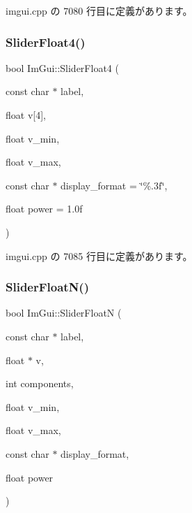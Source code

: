  imgui.\+cpp の 7080 行目に定義があります。

\mbox{\label{namespace_im_gui_aab6b7e99cab3975fece12fb1cd56e281}} 
\subsubsection{\texorpdfstring{Slider\+Float4()}{SliderFloat4()}}
{\footnotesize\ttfamily bool Im\+Gui\+::\+Slider\+Float4 (\begin{DoxyParamCaption}\item[{const char $\ast$}]{label,  }\item[{float}]{v\mbox{[}4\mbox{]},  }\item[{float}]{v\+\_\+min,  }\item[{float}]{v\+\_\+max,  }\item[{const char $\ast$}]{display\+\_\+format = {\ttfamily \char`\"{}\%.3f\char`\"{}},  }\item[{float}]{power = {\ttfamily 1.0f} }\end{DoxyParamCaption})}



 imgui.\+cpp の 7085 行目に定義があります。

\mbox{\label{namespace_im_gui_a3ffffbdfe59f18a2321dd1cb39dfb6e1}} 
\subsubsection{\texorpdfstring{Slider\+Float\+N()}{SliderFloatN()}}
{\footnotesize\ttfamily bool Im\+Gui\+::\+Slider\+FloatN (\begin{DoxyParamCaption}\item[{const char $\ast$}]{label,  }\item[{float $\ast$}]{v,  }\item[{int}]{components,  }\item[{float}]{v\+\_\+min,  }\item[{float}]{v\+\_\+max,  }\item[{const char $\ast$}]{display\+\_\+format,  }\item[{float}]{power }\end{DoxyParamCaption})}



